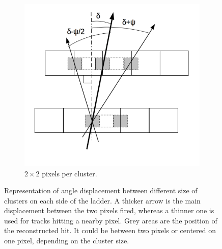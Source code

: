 \begin{figure}[!h]
      \begin{subfigure}[t]{0.45\textwidth}
        \centering
        \includegraphics[width = \textwidth]{Pictures/deformation/cluster2x2_jerome.png}
        \caption{$2 \times 2$ pixels per cluster.}
        \label{fig:2x2clusters}
      \end{subfigure}
      \caption{Representation of angle displacement between different size of clusters on each side of the ladder. A thicker arrow is the main displacement between the two pixels fired, whereas a thinner one is used for tracks hitting a nearby pixel. Grey areas are the position of the reconstructed hit. It could be between two pixels or centered on one pixel, depending on the cluster size.}
      \label{fig:clusterSize}
   \end{figure}



